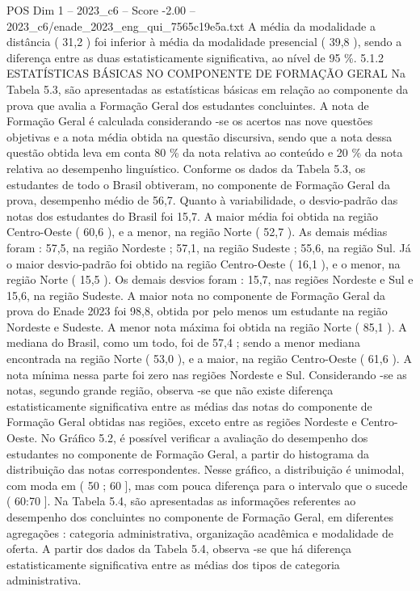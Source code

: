 \begin{textsample}{POS Dim 1 – 2023\_c6 – Score -2.00 – 2023\_c6/enade\_2023\_eng\_qui\_7565c19e5a.txt}
A média da modalidade a distância ( 31,2 ) foi inferior à média da modalidade presencial ( 39,8 ), sendo a diferença entre as duas estatisticamente significativa, ao nível de 95 \%. 5.1.2 ESTATÍSTICAS BÁSICAS NO COMPONENTE DE FORMAÇÃO GERAL Na Tabela 5.3, são apresentadas as estatísticas básicas em relação ao componente da prova que avalia a Formação Geral dos estudantes concluintes.
A nota de Formação Geral é calculada considerando -se os acertos nas nove questões objetivas e a nota média obtida na questão discursiva, sendo que a nota dessa questão obtida leva em conta 80 \% da nota relativa ao conteúdo e 20 \% da nota relativa ao desempenho linguístico.
Conforme os dados da Tabela 5.3, os estudantes de todo o Brasil obtiveram, no componente de Formação Geral da prova, desempenho médio de 56,7.
Quanto à variabilidade, o desvio-padrão das notas dos estudantes do Brasil foi 15,7.
A maior média foi obtida na região Centro-Oeste ( 60,6 ), e a menor, na região Norte ( 52,7 ).
As demais médias foram : 57,5, na região Nordeste ; 57,1, na região Sudeste ; 55,6, na região Sul.
Já o maior desvio-padrão foi obtido na região Centro-Oeste ( 16,1 ), e o menor, na região Norte ( 15,5 ).
Os demais desvios foram : 15,7, nas regiões Nordeste e Sul e 15,6, na região Sudeste.
A maior nota no componente de Formação Geral da prova do Enade 2023 foi 98,8, obtida por pelo menos um estudante na região Nordeste e Sudeste.
A menor nota máxima foi obtida na região Norte ( 85,1 ).
A mediana do Brasil, como um todo, foi de 57,4 ; sendo a menor mediana encontrada na região Norte ( 53,0 ), e a maior, na região Centro-Oeste ( 61,6 ).
A nota mínima nessa parte foi zero nas regiões Nordeste e Sul.
Considerando -se as notas, segundo grande região, observa -se que não existe diferença estatisticamente significativa entre as médias das notas do componente de Formação Geral obtidas nas regiões, exceto entre as regiões Nordeste e Centro-Oeste.
No Gráfico 5.2, é possível verificar a avaliação do desempenho dos estudantes no componente de Formação Geral, a partir do histograma da distribuição das notas correspondentes.
Nesse gráfico, a distribuição é unimodal, com moda em ( 50 ; 60 ], mas com pouca diferença para o intervalo que o sucede ( 60:70 ].
Na Tabela 5.4, são apresentadas as informações referentes ao desempenho dos concluintes no componente de Formação Geral, em diferentes agregações : categoria administrativa, organização acadêmica e modalidade de oferta.
A partir dos dados da Tabela 5.4, observa -se que há diferença estatisticamente significativa entre as médias dos tipos de categoria administrativa.

\end{textsample}
